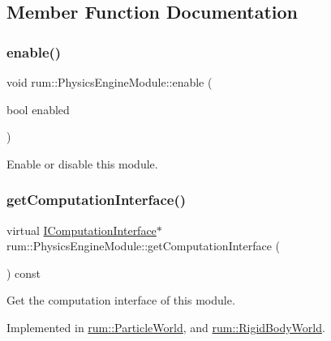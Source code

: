 \subsection{Member Function Documentation}
\mbox{\label{classrum_1_1_physics_engine_module_ae78a3d6c0ef4d2bb8c4b64d8c256b73c}} 
\subsubsection{\texorpdfstring{enable()}{enable()}}
{\footnotesize\ttfamily void rum\+::\+Physics\+Engine\+Module\+::enable (\begin{DoxyParamCaption}\item[{bool}]{enabled }\end{DoxyParamCaption})}

Enable or disable this module. \mbox{\label{classrum_1_1_physics_engine_module_ae6046bf333d8ecebf1a2ae4eee4833c1}} 
\subsubsection{\texorpdfstring{get\+Computation\+Interface()}{getComputationInterface()}}
{\footnotesize\ttfamily virtual \mbox{\hyperlink{classrum_1_1_i_computation_interface}{I\+Computation\+Interface}}$\ast$ rum\+::\+Physics\+Engine\+Module\+::get\+Computation\+Interface (\begin{DoxyParamCaption}{ }\end{DoxyParamCaption}) const\hspace{0.3cm}{\ttfamily [pure virtual]}}

Get the computation interface of this module. 

Implemented in \mbox{\hyperlink{classrum_1_1_particle_world_aceee885d3fbc9394d2f05abfcd38c099}{rum\+::\+Particle\+World}}, and \mbox{\hyperlink{classrum_1_1_rigid_body_world_a0ab6763b69b3802d773c68209b0c4c24}{rum\+::\+Rigid\+Body\+World}}.

